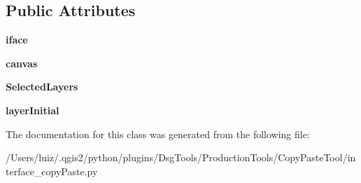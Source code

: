 \subsection*{Public Attributes}
\begin{DoxyCompactItemize}
\item 
\mbox{\label{class_dsg_tools_1_1_production_tools_1_1_copy_paste_tool_1_1interface__copy_paste_1_1_copy_paste_a54c3078bf25e6a0099d93a5517f83cb5}} 
{\bfseries iface}
\item 
\mbox{\label{class_dsg_tools_1_1_production_tools_1_1_copy_paste_tool_1_1interface__copy_paste_1_1_copy_paste_a8a0e47650f1d36351cbd63b652e5776a}} 
{\bfseries canvas}
\item 
\mbox{\label{class_dsg_tools_1_1_production_tools_1_1_copy_paste_tool_1_1interface__copy_paste_1_1_copy_paste_a0c2e7bb4287cb8cc2f983a9cbe5dec72}} 
{\bfseries Selected\+Layers}
\item 
\mbox{\label{class_dsg_tools_1_1_production_tools_1_1_copy_paste_tool_1_1interface__copy_paste_1_1_copy_paste_ac09c359c973c1ecf546f57e6d4339252}} 
{\bfseries layer\+Initial}
\end{DoxyCompactItemize}


The documentation for this class was generated from the following file\+:\begin{DoxyCompactItemize}
\item 
/\+Users/luiz/.\+qgis2/python/plugins/\+Dsg\+Tools/\+Production\+Tools/\+Copy\+Paste\+Tool/interface\+\_\+copy\+Paste.\+py\end{DoxyCompactItemize}
